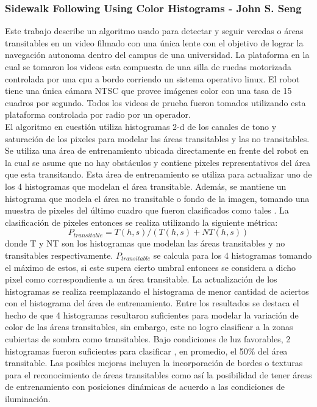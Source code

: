 	\subsubsection{Sidewalk Following Using Color Histograms - John S. Seng}
	Este trabajo describe un algoritmo usado para detectar y seguir 
	veredas o áreas transitables en un video filmado con una única 
	lente con el objetivo de lograr la navegación autonoma dentro del 
	campus de una universidad. La plataforma en la cual se tomaron los videos esta 
	compuesta de una silla de ruedas motorizada controlada por una cpu 
	a bordo corriendo un sistema operativo linux. El robot tiene una 
	única cámara NTSC que provee imágenes color con una tasa de 15 
	cuadros por segundo. Todos los videos de prueba fueron tomados 
	utilizando esta plataforma controlada por radio por un operador.\\
	\indent El algoritmo en cuestión utiliza histogramas 2-d de los 
	canales de tono y saturación de los pixeles para modelar las áreas
	transitables y las no transitables. Se utiliza una área de 
	entrenamiento ubicada directamente en frente del robot en la cual se asume que 
	no hay obstáculos y contiene pixeles representativos del área que 
	esta transitando. Esta área de entrenamiento se utiliza para 
	actualizar uno de los 4 histogramas que modelan el área 
	transitable. Además, se mantiene un histograma que modela el
	área no transitable o fondo de la imagen, tomando una muestra de pixeles del último 
	cuadro que fueron clasificados como tales . La 
	clasificación de pixeles entonces se realiza utilizando la 
	siguiente métrica:
	\[
	P_{transitable}= T(h,s)/ ( T(h,s) + NT(h,s))
	\]
	donde T y NT son los histogramas que modelan las áreas transitables
	y no transitables respectivamente. $P_{transitable}$ se calcula para 
	los 4 histogramas tomando el máximo de estos, si este supera 
	cierto umbral entonces se considera a dicho pixel como 
	correspondiente a un área transitable.
	La actualización de los histogramas se realiza reemplazando el 
	histograma de menor cantidad de aciertos con el histograma 
	del área de entrenamiento.  Entre los resultados se destaca el 
	hecho de que 4 histogramas resultaron suficientes para modelar la
	variación de color de las áreas transitables, sin embargo, este no 
	logro clasificar a la zonas cubiertas de sombra como transitables.
	Bajo condiciones de luz favorables, 2 histogramas fueron 
	suficientes para clasificar , en promedio, el 50\% del área 
	transitable. Las posibles mejoras incluyen la incorporación de 
	bordes o texturas para el reconocimiento de áreas transitables 
	como así la posibilidad de tener áreas de entrenamiento con 
	posiciones dinámicas de acuerdo a las condiciones de iluminación.
	
